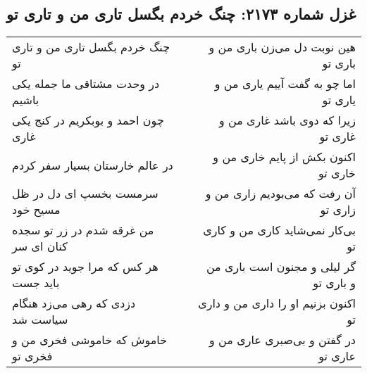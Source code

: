 \begin{center}
\section*{غزل شماره ۲۱۷۳: چنگ خردم بگسل تاری من و تاری تو}
\label{sec:2173}
\begin{longtable}{l p{0.5cm} r}
چنگ خردم بگسل تاری من و تاری تو
&&
هین نوبت دل می‌زن باری من و باری تو
\\
در وحدت مشتاقی ما جمله یکی باشیم
&&
اما چو به گفت آییم یاری من و یاری تو
\\
چون احمد و بوبکریم در کنج یکی غاری
&&
زیرا که دوی باشد غاری من و غاری تو
\\
در عالم خارستان بسیار سفر کردم
&&
اکنون بکش از پایم خاری من و خاری تو
\\
سرمست بخسپ ای دل در ظل مسیح خود
&&
آن رفت که می‌بودیم زاری من و زاری تو
\\
من غرقه شدم در زر تو سجده کنان ای سر
&&
بی‌کار نمی‌شاید کاری من و کاری تو
\\
هر کس که مرا جوید در کوی تو باید جست
&&
گر لیلی و مجنون است باری من و باری تو
\\
دزدی که رهی می‌زد هنگام سیاست شد
&&
اکنون بزنیم او را داری من و داری تو
\\
خاموش که خاموشی فخری من و فخری تو
&&
در گفتن و بی‌صبری عاری من و عاری تو
\\
\end{longtable}
\end{center}
